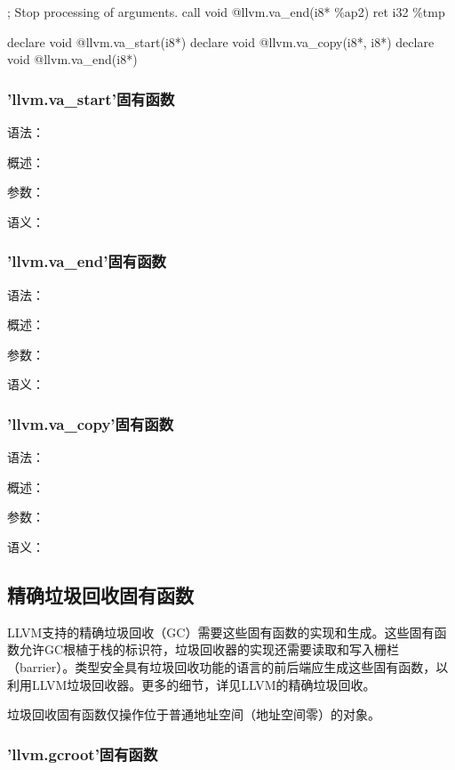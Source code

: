 \documentclass[12pt,a4paper]{article}
\begin{document}
{{  ; Stop processing of arguments.
  call void @llvm.va\_end(i8* \%ap2)
  ret i32 \%tmp
}

declare void @llvm.va\_start(i8*)
declare void @llvm.va\_copy(i8*, i8*)
declare void @llvm.va\_end(i8*)

\subsubsection{'llvm.va\_start'固有函数} %

语法：

概述：

参数：

语义：


\subsubsection{'llvm.va\_end'固有函数} %

语法：

概述：

参数：

语义：


\subsubsection{'llvm.va\_copy'固有函数} %

语法：

概述：

参数：

语义：


\subsection{精确垃圾回收固有函数}

LLVM支持的精确垃圾回收（GC）需要这些固有函数的实现和生成。这些固有函数允许GC根植于栈的标识符，垃圾回收器的实现还需要读取和写入栅栏（barrier）。类型安全具有垃圾回收功能的语言的前后端应生成这些固有函数，以利用LLVM垃圾回收器。更多的细节，详见LLVM的精确垃圾回收。

垃圾回收固有函数仅操作位于普通地址空间（地址空间零）的对象。

\subsubsection{'llvm.gcroot'固有函数} %

}
\end{document}
